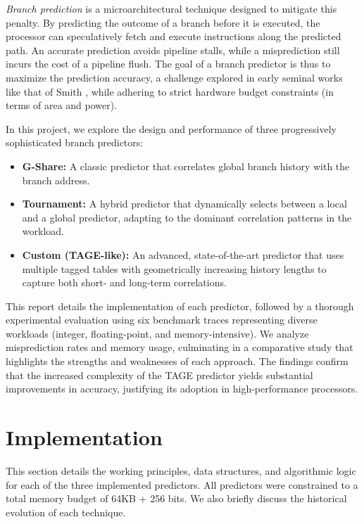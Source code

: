 \documentclass[sigconf, screen]{acmart}
\begin{document}
\emph{Branch prediction} is a microarchitectural technique designed to mitigate this penalty. By predicting the outcome of a branch before it is executed, the processor can speculatively fetch and execute instructions along the predicted path. An accurate prediction avoids pipeline stalls, while a misprediction still incurs the cost of a pipeline flush. The goal of a branch predictor is thus to maximize the prediction accuracy, a challenge explored in early seminal works like that of Smith \cite{yhsmith1981}, while adhering to strict hardware budget constraints (in terms of area and power).

In this project, we explore the design and performance of three progressively sophisticated branch predictors:
\begin{itemize}
    \item \textbf{G-Share:} A classic predictor that correlates global branch history with the branch address.
    \item \textbf{Tournament:} A hybrid predictor that dynamically selects between a local and a global predictor, adapting to the dominant correlation patterns in the workload.
    \item \textbf{Custom (TAGE-like):} An advanced, state-of-the-art predictor that uses multiple tagged tables with geometrically increasing history lengths to capture both short- and long-term correlations.
\end{itemize}

This report details the implementation of each predictor, followed by a thorough experimental evaluation using six benchmark traces representing diverse workloads (integer, floating-point, and memory-intensive). We analyze misprediction rates and memory usage, culminating in a comparative study that highlights the strengths and weaknesses of each approach. The findings confirm that the increased complexity of the TAGE predictor yields substantial improvements in accuracy, justifying its adoption in high-performance processors.

\section{Implementation}

This section details the working principles, data structures, and algorithmic logic for each of the three implemented predictors. All predictors were constrained to a total memory budget of 64KB + 256 bits. We also briefly discuss the historical evolution of each technique.
\end{document}
